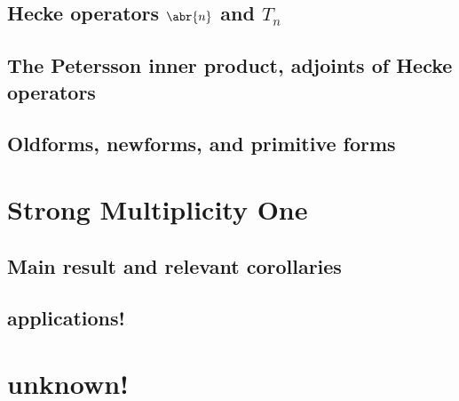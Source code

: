 \documentclass[11pt,leqno]{article}
\begin{document}
\subsection{Hecke operators $\abr{n}$ and $T_n$}
\subsection{The Petersson inner product, adjoints of Hecke operators}
\subsection{Oldforms, newforms, and primitive forms}

\newpage\section{Strong Multiplicity One}
\subsection{Main result and relevant corollaries}
\subsection{applications!}

\newpage\section{unknown!}
\end{document}

